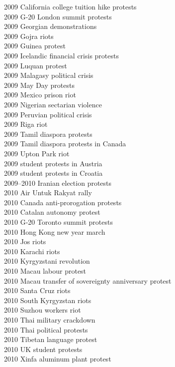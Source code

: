 2009 California college tuition hike protests\\
2009 G-20 London summit protests\\
2009 Georgian demonstrations\\
2009 Gojra riots\\
2009 Guinea protest\\
2009 Icelandic financial crisis protests\\
2009 Luquan protest\\
2009 Malagasy political crisis\\
2009 May Day protests\\
2009 Mexico prison riot\\
2009 Nigerian sectarian violence\\
2009 Peruvian political crisis\\
2009 Riga riot\\
2009 Tamil diaspora protests\\
2009 Tamil diaspora protests in Canada\\
2009 Upton Park riot\\
2009 student protests in Austria\\
2009 student protests in Croatia\\
2009–2010 Iranian election protests\\
2010 Air Untuk Rakyat rally\\
2010 Canada anti-prorogation protests\\
2010 Catalan autonomy protest\\
2010 G-20 Toronto summit protests\\
2010 Hong Kong new year march\\
2010 Jos riots\\
2010 Karachi riots\\
2010 Kyrgyzstani revolution\\
2010 Macau labour protest\\
2010 Macau transfer of sovereignty anniversary protest\\
2010 Santa Cruz riots\\
2010 South Kyrgyzstan riots\\
2010 Suzhou workers riot\\
2010 Thai military crackdown\\
2010 Thai political protests\\
2010 Tibetan language protest\\
2010 UK student protests\\
2010 Xinfa aluminum plant protest\\
